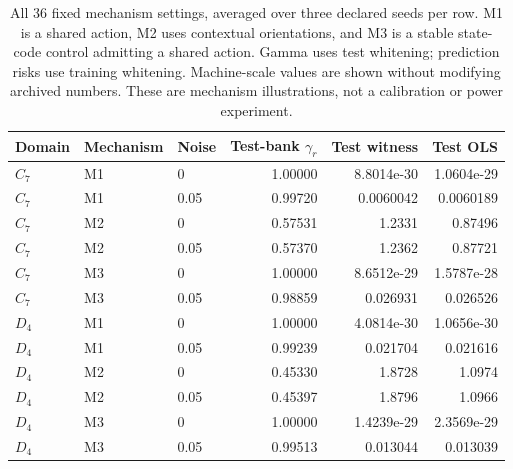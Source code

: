 \begin{table}[ht]
\centering\small
\begin{tabular}{@{}lllrrr@{}}
\toprule
Domain & Mechanism & Noise & Test-bank $\gamma_r$ & Test witness & Test OLS \\
\midrule
$C_7$ & M1 & 0 & 1.00000 & 8.8014e-30 & 1.0604e-29 \\
$C_7$ & M1 & 0.05 & 0.99720 & 0.0060042 & 0.0060189 \\
$C_7$ & M2 & 0 & 0.57531 & 1.2331 & 0.87496 \\
$C_7$ & M2 & 0.05 & 0.57370 & 1.2362 & 0.87721 \\
$C_7$ & M3 & 0 & 1.00000 & 8.6512e-29 & 1.5787e-28 \\
$C_7$ & M3 & 0.05 & 0.98859 & 0.026931 & 0.026526 \\
$D_4$ & M1 & 0 & 1.00000 & 4.0814e-30 & 1.0656e-30 \\
$D_4$ & M1 & 0.05 & 0.99239 & 0.021704 & 0.021616 \\
$D_4$ & M2 & 0 & 0.45330 & 1.8728 & 1.0974 \\
$D_4$ & M2 & 0.05 & 0.45397 & 1.8796 & 1.0966 \\
$D_4$ & M3 & 0 & 1.00000 & 1.4239e-29 & 2.3569e-29 \\
$D_4$ & M3 & 0.05 & 0.99513 & 0.013044 & 0.013039 \\
\bottomrule
\end{tabular}
\caption{All 36 fixed mechanism settings, averaged over three declared seeds per row. M1 is a shared action, M2 uses contextual orientations, and M3 is a stable state-code control admitting a shared action. Gamma uses test whitening; prediction risks use training whitening. Machine-scale values are shown without modifying archived numbers. These are mechanism illustrations, not a calibration or power experiment.}
\label{tab:followup-simulations}
\end{table}
